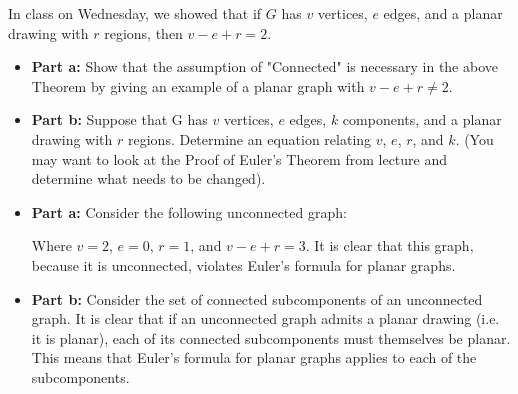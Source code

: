 \documentclass{article}
\begin{document}
\begin{problem} In class on Wednesday, we showed that if $G$ has $v$ vertices, $e$ edges, and a planar drawing with $r$ regions, then $v-e+r=2$.
\begin{itemize}
	\item[]{\textbf{Part a:}} Show that the assumption of "Connected" is necessary in the above Theorem by giving an example of a planar graph with $v-e+r \neq 2$.
	\item[]{\textbf{Part b:}} Suppose that G has $v$ vertices, $e$ edges, $k$ components, and a planar drawing with $r$ regions.  Determine an equation relating $v$, $e$, $r$, and $k$. (You may want to look at the Proof of Euler's Theorem from lecture and determine what needs to be changed).
\end{itemize}
\end{problem}

\begin{solution}
\begin{itemize}
	\item[]{\textbf{Part a:}} Consider the following unconnected graph:
		\vskip 0.15in \noindent
		\vskip 0.15in \noindent
		Where $v = 2$, $e = 0$, $r = 1$, and $v - e + r = 3$.  It is clear that this graph, 		because it is unconnected, violates Euler's formula for planar graphs.
	\item[]{\textbf{Part b:}} Consider the set of connected subcomponents of an unconnected graph.  It is clear that if an unconnected graph admits a planar drawing (i.e. it is planar), each of its connected subcomponents must themselves be planar.  This means that Euler's formula for planar graphs applies to each of the subcomponents.
\end{itemize}
\end{solution}
\end{document}
